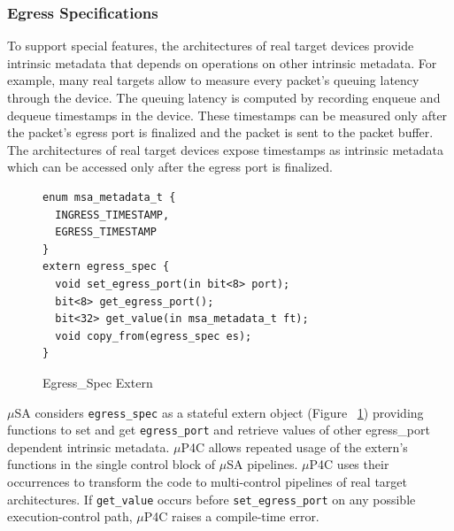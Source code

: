 \documentclass[10pt,sigconf,letterpaper,anonymous]{acmart}
\begin{document}
\subsubsection{Egress Specifications}
To support special features, the architectures of real target devices provide intrinsic metadata  that depends on operations on other intrinsic metadata.
For example,  many real targets allow to measure every packet's queuing latency through the device.
The queuing latency is computed by recording enqueue and dequeue timestamps in the device.
These timestamps can be measured only after the packet's egress port is finalized and the packet is sent to the packet buffer.
The architectures of real target devices expose timestamps as intrinsic metadata which can be accessed only after the egress port is finalized.
\begin{figure}[!h]
\begin{lstlisting}[frame=none]
enum msa_metadata_t {
  INGRESS_TIMESTAMP,
  EGRESS_TIMESTAMP
}
extern egress_spec {
  void set_egress_port(in bit<8> port);
  bit<8> get_egress_port();
  bit<32> get_value(in msa_metadata_t ft);
  void copy_from(egress_spec es);
}
\end{lstlisting}
\caption{Egress\_Spec Extern}
\label{fig:msa-egress-spec-extern}
\end{figure}
$\mu$SA considers \texttt{egress\_spec} as a stateful extern object (Figure ~\ref{fig:msa-egress-spec-extern}) providing functions to set and get \texttt{egress\_port} and retrieve values of other egress\_port dependent intrinsic metadata.
$\mu$P4C allows repeated usage of the extern's functions in the single control block of $\mu$SA pipelines.
$\mu$P4C uses their occurrences to transform the code to multi-control pipelines of real target architectures.
If \texttt{get\_value} occurs before \texttt{set\_egress\_port} on any possible execution-control path, $\mu$P4C raises a compile-time error.
\end{document}
